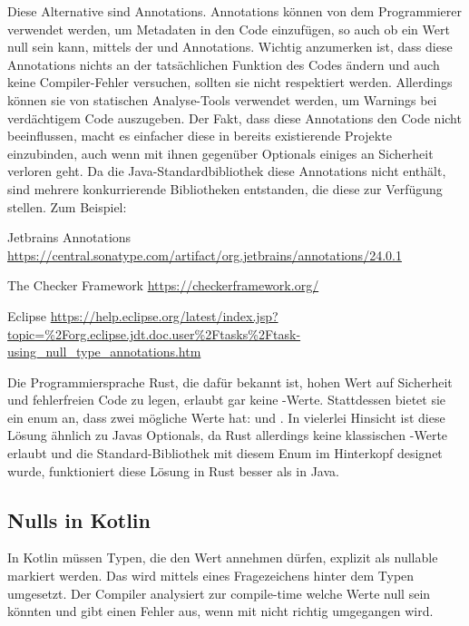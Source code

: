 Diese Alternative sind Annotations.\label{java-null-annotations}
Annotations können von dem Programmierer verwendet werden, um Metadaten in den Code einzufügen, so auch ob ein Wert null
sein kann, mittels der  und  Annotations.
Wichtig anzumerken ist, dass diese Annotations nichts an der tatsächlichen Funktion des Codes ändern und auch keine
Compiler-Fehler versuchen, sollten sie nicht respektiert werden.
Allerdings können sie von statischen Analyse-Tools verwendet werden, um Warnings bei verdächtigem Code auszugeben.
Der Fakt, dass diese Annotations den Code nicht beeinflussen, macht es einfacher diese in bereits existierende Projekte
einzubinden, auch wenn mit ihnen gegenüber Optionals einiges an Sicherheit verloren geht.
Da die Java-Standardbibliothek diese Annotations nicht enthält, sind mehrere konkurrierende Bibliotheken entstanden,
die diese zur Verfügung stellen.
Zum Beispiel:
\begin{liste}
    \item Jetbrains Annotations \url{https://central.sonatype.com/artifact/org.jetbrains/annotations/24.0.1}
    \item The Checker Framework \url{https://checkerframework.org/}
    \item Eclipse \url{https://help.eclipse.org/latest/index.jsp?topic=%2Forg.eclipse.jdt.doc.user%2Ftasks%2Ftask-using_null_type_annotations.htm}
\end{liste}

Die Programmiersprache Rust, die dafür bekannt ist, hohen Wert auf Sicherheit und fehlerfreien Code zu legen, erlaubt
gar keine -Werte.
Stattdessen bietet sie ein  enum an, dass zwei mögliche Werte hat:
 und .
In vielerlei Hinsicht ist diese Lösung ähnlich zu Javas Optionals, da Rust allerdings keine klassischen
-Werte erlaubt und die Standard-Bibliothek mit diesem Enum im Hinterkopf designet wurde, funktioniert
diese Lösung in Rust besser als in Java.

\subsection{Nulls in Kotlin}
In Kotlin müssen Typen, die den Wert  annehmen dürfen, explizit als nullable markiert werden.
Das wird mittels eines Fragezeichens hinter dem Typen umgesetzt.
Der Compiler analysiert zur compile-time welche Werte null sein könnten und gibt einen Fehler aus, wenn mit
 nicht richtig umgegangen wird.

